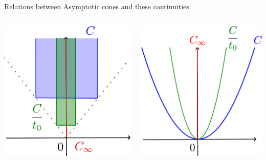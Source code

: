 \documentclass[aspectratio=169, dvipdfmx, 11pt]{beamer} %
\begin{document}
\begin{frame}[t]{Relations between Asymptotic cones and these continuities}
  \centering
  \begin{columns}
    \pause
    \begin{column}{0.48\textwidth}
    \centering
    \includegraphics[keepaspectratio, scale=0.085]{figures/continuities/figure_not_uc_but_Huc.eps}
    \end{column}
    \pause
    \begin{column}{0.48\textwidth}
    \centering
    \includegraphics[keepaspectratio, scale=0.082]{figures/continuities/figure_not_uc_and_Huc.eps}
    \end{column}
  \end{columns}
\end{frame}
\end{document}
